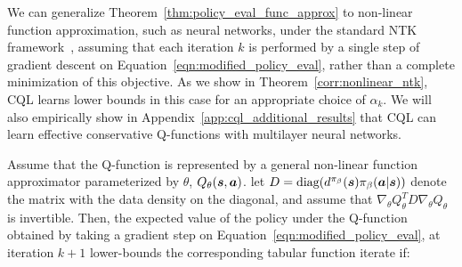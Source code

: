 We can generalize Theorem~\ref{thm:policy_eval_func_approx} to non-linear function approximation, such as neural networks, {under the standard NTK framework~\citep{ntk}}, assuming that each iteration $k$ is performed by a single step of gradient descent on Equation~\ref{eqn:modified_policy_eval}, rather than a complete minimization of this objective. As we show in Theorem~\ref{corr:nonlinear_ntk}, CQL learns lower bounds in this case for an appropriate choice of $\alpha_k$. We will also empirically show in Appendix~\ref{app:cql_additional_results} that CQL can learn effective conservative Q-functions with multilayer neural networks.

\begin{theorem}
\label{corr:nonlinear_ntk}
Assume that the Q-function is represented by a general non-linear function approximator parameterized by $\theta$, $Q_\theta(\boldsymbol{s}, \boldsymbol{a})$. let $D = \text{diag}(d^{\pi_\beta}(\boldsymbol{s}) {\pi_\beta}(\boldsymbol{a}|\boldsymbol{s}))$ denote the matrix with the data density on the diagonal, and assume that $\nabla_\theta Q_\theta^T D \nabla_\theta Q_\theta$ is invertible. Then, the expected value of the policy under the Q-function obtained by taking a gradient step on Equation~\ref{eqn:modified_policy_eval}, at iteration $k+1$ lower-bounds the corresponding tabular function iterate if: 
\end{theorem}


